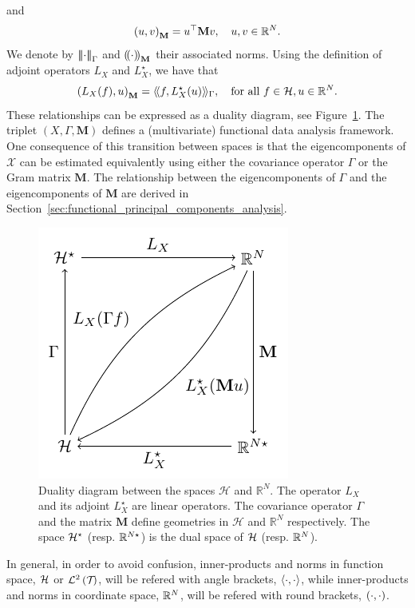 and
\begin{equation}
\inRM{u}{v} = u^\top \mathbf{M} v,\quad u, v \in \RR^N.
\end{equation}
We denote by $\left|\!\left|\!\left|\cdot\right|\!\right|\!\right|_\Gamma$ and $\left(\!\left(\cdot\right)\!\right)_{\mathbf{M}}$ their associated norms.
Using the definition of adjoint operators $L_X$ and $L^\star_X$, we have that
\begin{equation}
    \inRM{L_X(f)}{u} = \inHG{f}{L^\star_X(u)}, \quad\text{for all}\ f \in \HH, u \in \RR^N.
\end{equation}
These relationships can be expressed as a duality diagram, see Figure~\ref{fig:duality_diagram}. The triplet $(X, \Gamma, \mathbf{M})$ defines a (multivariate) functional data analysis framework. One consequence of this transition between spaces is that the eigencomponents of $\mathcal{X}$ can be estimated equivalently using either the covariance operator $\Gamma$ or the Gram matrix $\mathbf{M}$. The relationship between the eigencomponents of $\Gamma$ and the eigencomponents of $\mathbf{M}$ are derived in Section~\ref{sec:functional_principal_components_analysis}.
\begin{figure}
    \centering
    \includegraphics[scale=1.2]{figures/duality_diagram.pdf}
    \caption{Duality diagram between the spaces $\mathcal{H}$ and $\mathbb{R}^N$. The operator $L_X$ and its adjoint $L^\star_X$ are linear operators. The covariance operator $\Gamma$ and the matrix $\mathbf{M}$ define geometries in $\mathcal{H}$ and $\mathbb{R}^N$ respectively. The space $\mathcal{H}^\star$ (resp. $\mathbb{R}^{N \star}$) is the dual space of $\mathcal{H}$ (resp. $\mathbb{R}^N$).}
    \label{fig:duality_diagram}
\end{figure}

\begin{remark}
   In general, in order to avoid confusion, inner-products and norms in function space, $\mathcal{H}$ or $\mathcal{L}^{2}\left(\mathcal{T}_{}\right)$, will be refered with angle brackets, $\left\langle\cdot, \cdot\right\rangle$, while inner-products and norms in coordinate space, $\mathbb{R}^N$,  will be refered with round brackets, $\left(\cdot, \cdot\right)$.
\end{remark}


